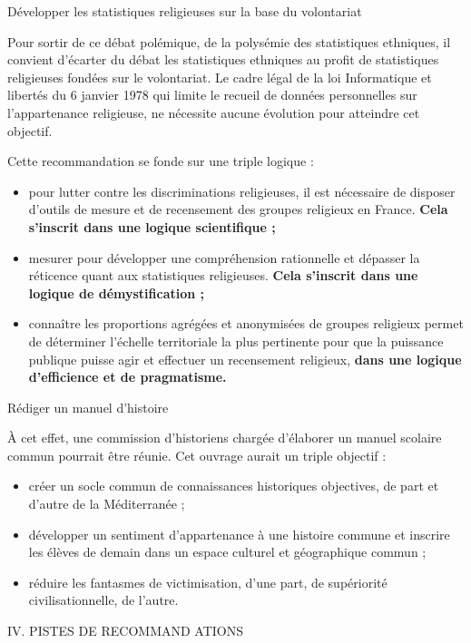 Développer les statistiques religieuses sur la base du volontariat


Pour sortir de ce débat polémique, de la polysémie des statistiques
ethniques, il convient d'écarter du débat les statistiques ethniques au
profit de statistiques religieuses fondées sur le volontariat. Le cadre
légal de la loi Informatique et libertés du 6 janvier 1978 qui limite le
recueil de données personnelles sur l'appartenance religieuse, ne
nécessite aucune évolution pour atteindre cet objectif.

Cette recommandation se fonde sur une triple logique :


\begin{itemize}
\item
  pour lutter contre les discriminations religieuses, il est nécessaire
  de disposer d'outils de mesure et de recensement des groupes religieux
  en France. \textbf{Cela s'inscrit dans une logique scientifique ;}
\item
  mesurer pour développer une compréhension rationnelle et dépasser la
  réticence quant aux statistiques religieuses. \textbf{Cela s'inscrit
  dans une logique de démystification ;}
\item
  connaître les proportions agrégées et anonymisées de groupes religieux
  permet de déterminer l'échelle territoriale la plus pertinente pour
  que la puissance publique puisse agir et effectuer un recensement
  religieux, \textbf{dans une logique d'efficience et de pragmatisme.}
\end{itemize}

Rédiger un manuel d'histoire


À cet effet, une commission d'historiens chargée d'élaborer un manuel
scolaire commun pourrait être réunie. Cet ouvrage aurait un triple
objectif :


\begin{itemize}
\item
  créer un socle commun de connaissances historiques objectives, de part
  et d'autre de la Méditerranée ;
\item
  développer un sentiment d'appartenance à une histoire commune et
  inscrire les élèves de demain dans un espace culturel et géographique
  commun ;
\item
  réduire les fantasmes de victimisation, d'une part, de supériorité
  civilisationnelle, de l'autre.
\end{itemize}


IV. PISTES DE RECOMMAND ATIONS


